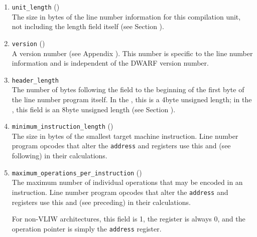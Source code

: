 \begin{enumerate}[1. ]
\item \texttt{unit\_length} ()  \\
The size in bytes of the line number information for this
compilation unit, not including the length field itself
(see Section ). 

\item \texttt{version} () \\
A version number 
(see Appendix ). 
This number is specific to
the line number information and is independent of the DWARF
version number. 

\item \texttt{header\_length}  \\
The number of bytes following the  field to the
beginning of the first byte of the line number program itself.
In the \thirtytwobitdwarfformat, this is a 4\dash byte unsigned
length; in the \sixtyfourbitdwarfformat, this field is an
8\dash byte unsigned length 
(see Section ). 

\item \texttt{minimum\_instruction\_length} ()  \\
The size in bytes of the smallest target machine
instruction. Line number program opcodes that alter
the \texttt{address} and 
registers use this and
(see following) in their calculations. 

\item \texttt{maximum\_operations\_per\_instruction} () \\
The 
maximum number of individual operations that may be
encoded in an instruction. Line number program opcodes
that alter the \texttt{address} and 
 registers use this and
 (see preceding)
in their calculations.

For non-VLIW
architectures, this field is 1, the  register is always
0, and the operation pointer is simply the \texttt{address} register.


\end{enumerate}
